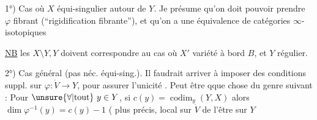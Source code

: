 
1°) Cas où $X$ équi-singulier autour de $Y$.
Je présume qu'on doit pouvoir prendre
$\varphi$ fibrant (``rigidification fibrante''),
et qu'on a une équivalence de catégories
$\infty$-isotopiques


\uline{NB} les $X\setminus Y,Y$
doivent correspondre au cas où
$X'$ variété à bord $B$, et $Y$ régulier.


2°) Cas général (pas néc. équi-sing.).
Il faudrait arriver à imposer des
conditions suppl. sur $\varphi:\dot V\longrightarrow Y$,
pour assurer l'unicité .
Peut être qque chose du genre
suivant : Pour $\unsure{\forall|\text{tout}}\ y\in Y$, si $c(y)=\operatorname{codim}_y(Y,X)$
alors $\dim\varphi^{-1}(y)=c(y)-1$
( plus précis, local sur $\dot V$  de l'être sur $Y$
